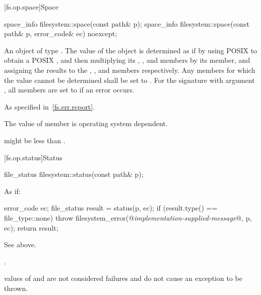 [fs.op.space]{Space}

%
\begin{itemdecl}
space_info filesystem::space(const path& p);
space_info filesystem::space(const path& p, error_code& ec) noexcept;
\end{itemdecl}

\begin{itemdescr}
\pnum
\returns
An object of type . The value of the 
  object is determined as if by using POSIX 
  to obtain a POSIX ,
  and then multiplying its , ,
  and  members by its  member,
  and assigning the results to the , ,
  and  members respectively. Any members for which the
  value cannot be determined shall be set to .
  For the signature with argument , all members are set to
   if an error occurs.

\pnum
\throws
As specified in~\ref{fs.err.report}.

\pnum
\remarks
The value of member 
      is operating system dependent.
\begin{note}
 might be
      less than .
\end{note}
\end{itemdescr}


[fs.op.status]{Status}

%
\begin{itemdecl}
file_status filesystem::status(const path& p);
\end{itemdecl}

\begin{itemdescr}
\pnum
\effects
As if:
\begin{codeblock}
error_code ec;
file_status result = status(p, ec);
if (result.type() == file_type::none)
  throw filesystem_error(@\textit{implementation-supplied-message}@, p, ec);
return result;
\end{codeblock}

\pnum
\returns
See above.

\pnum
\throws
{}.
\begin{note}
 values of 
  and  are not considered failures and do not
  cause an exception to be thrown.
\end{note}
\end{itemdescr}

